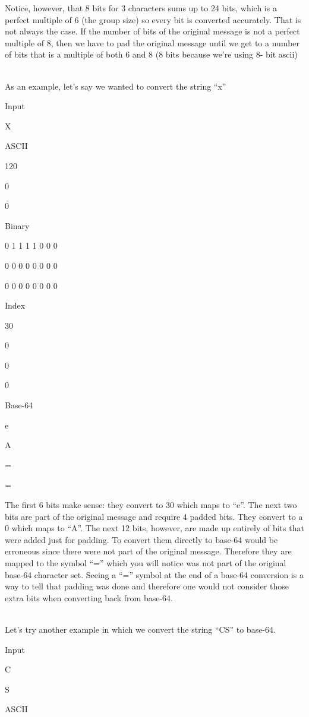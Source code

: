 \documentclass[
  letterpaper,
  DIV=11,
  numbers=noendperiod]{scrartcl}
\begin{document}
Notice, however, that 8 bits for 3 characters sums up to 24 bits, which
is a perfect multiple of 6 (the group size) so every bit is converted
accurately. That is not always the case. If the number of bits of the
original message is not a perfect multiple of 8, then we have to pad the
original message until we get to a number of bits that is a multiple of
both 6 and 8 (8 bits because we're using 8- bit ascii)\\
\strut \\
As an example, let's say we wanted to convert the string ``x''

Input

X

ASCII

120

0

0

Binary

0 1 1 1 1 0 0 0

0 0 0 0 0 0 0 0

0 0 0 0 0 0 0 0

Index

30

0

0

0

Base-64

e

A

=

=

The first 6 bits make sense: they convert to 30 which maps to ``e''. The
next two bits are part of the original message and require 4 padded
bits. They convert to a 0 which maps to ``A''. The next 12 bits,
however, are made up entirely of bits that were added just for padding.
To convert them directly to base-64 would be erroneous since there were
not part of the original message. Therefore they are mapped to the
symbol ``='' which you will notice was not part of the original base-64
character set. Seeing a ``='' symbol at the end of a base-64 conversion
is a way to tell that padding was done and therefore one would not
consider those extra bits when converting back from base-64.\\
\strut \\
Let's try another example in which we convert the string ``CS'' to
base-64.

Input

C

S

ASCII
\end{document}
